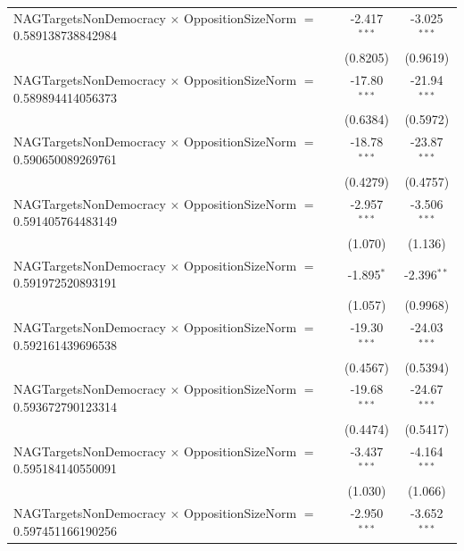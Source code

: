 \begin{tabular}{lcc}
   NAGTargetsNonDemocracy $\times$ OppositionSizeNorm $=$ 0.589138738842984     & -2.417$^{***}$       & -3.025$^{***}$\\   
                                                                                & (0.8205)             & (0.9619)\\   
   NAGTargetsNonDemocracy $\times$ OppositionSizeNorm $=$ 0.589894414056373     & -17.80$^{***}$       & -21.94$^{***}$\\   
                                                                                & (0.6384)             & (0.5972)\\   
   NAGTargetsNonDemocracy $\times$ OppositionSizeNorm $=$ 0.590650089269761     & -18.78$^{***}$       & -23.87$^{***}$\\   
                                                                                & (0.4279)             & (0.4757)\\   
   NAGTargetsNonDemocracy $\times$ OppositionSizeNorm $=$ 0.591405764483149     & -2.957$^{***}$       & -3.506$^{***}$\\   
                                                                                & (1.070)              & (1.136)\\   
   NAGTargetsNonDemocracy $\times$ OppositionSizeNorm $=$ 0.591972520893191     & -1.895$^{*}$         & -2.396$^{**}$\\   
                                                                                & (1.057)              & (0.9968)\\   
   NAGTargetsNonDemocracy $\times$ OppositionSizeNorm $=$ 0.592161439696538     & -19.30$^{***}$       & -24.03$^{***}$\\   
                                                                                & (0.4567)             & (0.5394)\\   
   NAGTargetsNonDemocracy $\times$ OppositionSizeNorm $=$ 0.593672790123314     & -19.68$^{***}$       & -24.67$^{***}$\\   
                                                                                & (0.4474)             & (0.5417)\\   
   NAGTargetsNonDemocracy $\times$ OppositionSizeNorm $=$ 0.595184140550091     & -3.437$^{***}$       & -4.164$^{***}$\\   
                                                                                & (1.030)              & (1.066)\\   
   NAGTargetsNonDemocracy $\times$ OppositionSizeNorm $=$ 0.597451166190256     & -2.950$^{***}$       & -3.652$^{***}$\\   

\end{tabular}
